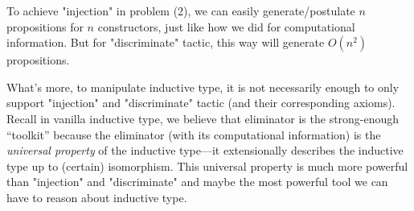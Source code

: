 








To achieve "injection" in problem (2), we can easily generate/postulate $n$ propositions for $n$ constructors, just like how we did for computational information. But for "discriminate" tactic, this way will generate $O(n^2)$ propositions. 

What's more, to manipulate inductive type, it is not necessarily enough to only support "injection" and "discriminate" tactic (and their corresponding axioms). Recall in vanilla inductive type, we believe that eliminator is the strong-enough ``toolkit'' because the eliminator (with its computational information) is the \textit{universal property} of the inductive type---it extensionally describes the inductive type up to (certain) isomorphism. This universal property is much more powerful than "injection" and "discriminate" and maybe the most powerful tool we can have to reason about inductive type. 


